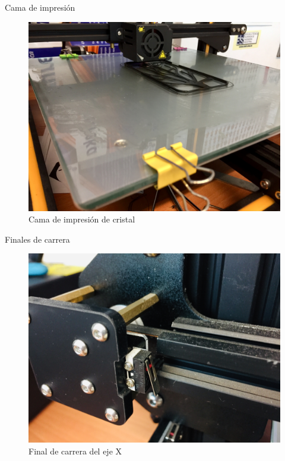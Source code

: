 \documentclass{beamer}
\begin{document}
	\begin{frame}{Cama de impresión}
		\begin{figure}
			\includegraphics[height=0.8\textheight]{images/cama}
			\caption{Cama de impresión de cristal}
		\end{figure}
	\end{frame}
	\begin{frame}{Finales de carrera}
		\begin{figure}
			\includegraphics[height=0.8\textheight]{images/final}
			\caption{Final de carrera del eje X}
		\end{figure}
	\end{frame}
	
\end{document}
